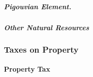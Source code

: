 


\subparagraph{Pigouvian Element.} %

\subparagraph{Other Natural Resources}




\subsubsection{Taxes on Property}

\paragraph{Property Tax}  \label{sec:PT}


